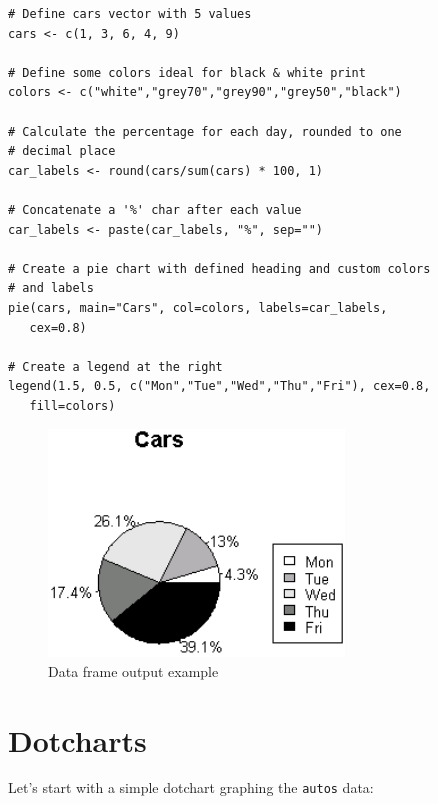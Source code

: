 \documentclass[10pt]{book}
\begin{document}
\begin{lstlisting}
# Define cars vector with 5 values
cars <- c(1, 3, 6, 4, 9)

# Define some colors ideal for black & white print
colors <- c("white","grey70","grey90","grey50","black")

# Calculate the percentage for each day, rounded to one 
# decimal place
car_labels <- round(cars/sum(cars) * 100, 1)

# Concatenate a '%' char after each value
car_labels <- paste(car_labels, "%", sep="")

# Create a pie chart with defined heading and custom colors
# and labels
pie(cars, main="Cars", col=colors, labels=car_labels,
   cex=0.8)

# Create a legend at the right   
legend(1.5, 0.5, c("Mon","Tue","Wed","Thu","Fri"), cex=0.8, 
   fill=colors)
\end{lstlisting}
\begin{figure}[H]
    \begin{flushleft}
        \includegraphics[width=0.7\textwidth]{pie_script3.png}
        \caption{Data frame output example}
        \label{fig:dataframe}
    \end{flushleft}
\end{figure}



\section*{Dotcharts}

Let's start with a simple dotchart graphing the \texttt{autos} data:
\end{document}
